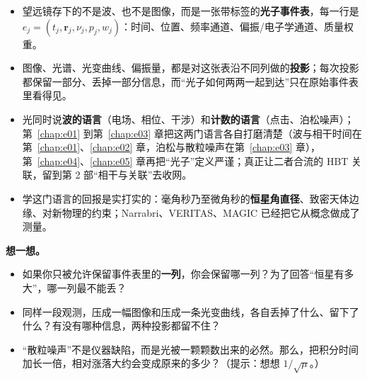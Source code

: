 \begin{itemize}
  \item 望远镜存下的不是波、也不是图像，而是一张带标签的\textbf{光子事件表}，每一行是 \(e_j=(t_j,\bm r_j,\nu_j,p_j,w_j)\)：时间、位置、频率通道、偏振/电子学通道、质量权重。
  \item 图像、光谱、光变曲线、偏振量，都是对这张表沿不同列做的\textbf{投影}；每次投影都保留一部分、丢掉一部分信息，而“光子如何两两一起到达”只在原始事件表里看得见。
  \item 光同时说\textbf{波的语言}（电场、相位、干涉）和\textbf{计数的语言}（点击、泊松噪声）；第~\ref{chap:e01} 到第~\ref{chap:e03} 章把这两门语言各自打磨清楚（波与相干时间在第~\ref{chap:e01}、\ref{chap:e02} 章，泊松与散粒噪声在第~\ref{chap:e03} 章），第~\ref{chap:e04}、\ref{chap:e05} 章再把“光子”定义严谨；真正让二者合流的 HBT 关联，留到第 2 部“相干与关联”去收网。
  \item 学这门语言的回报是实打实的：毫角秒乃至微角秒的\textbf{恒星角直径}、致密天体边缘、对新物理的约束；Narrabri、VERITAS、MAGIC 已经把它从概念做成了测量。
\end{itemize}

\medskip
\noindent\textbf{想一想。}
\begin{itemize}
  \item 如果你只被允许保留事件表里的\textbf{一列}，你会保留哪一列？为了回答“恒星有多大”，哪一列最不能丢？
  \item 同样一段观测，压成一幅图像和压成一条光变曲线，各自丢掉了什么、留下了什么？有没有哪种信息，两种投影都留不住？
  \item “散粒噪声”不是仪器缺陷，而是光被一颗颗数出来的必然。那么，把积分时间加长一倍，相对涨落大约会变成原来的多少？（提示：想想 \(1/\sqrt{\mu}\)。）
\end{itemize}
